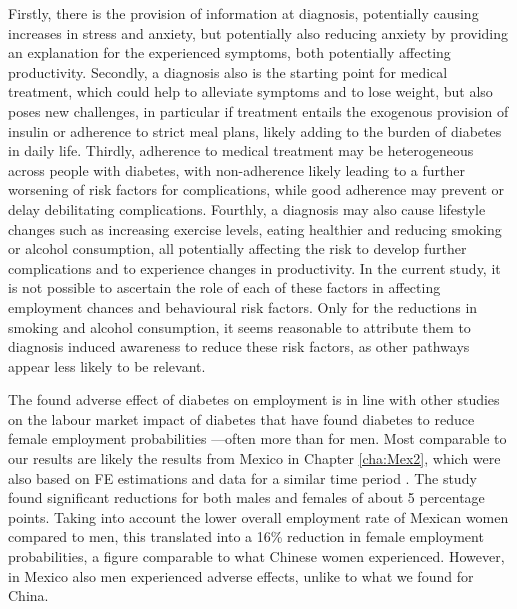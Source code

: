 Firstly, there is the provision of information at diagnosis, potentially causing increases in stress and anxiety, but potentially also reducing anxiety by providing an explanation for the experienced symptoms, both potentially affecting productivity. Secondly, a diagnosis also is the starting point for medical treatment, which could help to alleviate symptoms and to lose weight, but also poses new challenges, in particular if treatment entails the exogenous provision of insulin or adherence to strict meal plans, likely adding to the burden of diabetes in daily life. Thirdly, adherence to medical treatment may be heterogeneous across people with diabetes, with non-adherence likely leading to a further worsening of risk factors for complications, while good adherence may prevent or delay debilitating complications. Fourthly, a diagnosis may also cause lifestyle changes such as increasing exercise levels, eating healthier and reducing smoking or alcohol consumption, all potentially affecting the risk to develop further complications and to experience changes in productivity. In the current study, it is not possible to ascertain the role of each of these factors in affecting employment chances and behavioural risk factors. Only for the reductions in smoking and alcohol consumption, it seems reasonable to attribute them to diagnosis induced awareness to reduce these risk factors, as other pathways appear less likely to be relevant. 

The found adverse effect of diabetes on employment is in line with other studies on the labour market impact of diabetes that have found diabetes to reduce female employment probabilities \parencite{Minor2010,Latif2009,Harris2009,Seuring2016}---often more than for men. Most comparable to our results are likely the results from Mexico in Chapter \ref{cha:Mex2}, which were also based on \ac{FE} estimations and data for a similar time period \parencite{Seuring2016}. The study found significant reductions for both males and females of about 5 percentage points. Taking into account the lower overall employment rate of Mexican women compared to men, this translated into a 16\% reduction in female employment probabilities, a figure comparable to what Chinese women experienced. However, in Mexico also men experienced adverse effects, unlike to what we found for China.

